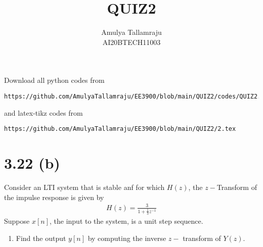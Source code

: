 \documentclass[journal,12pt,twocolumn]{IEEEtran}
\begin{document}
     \def\centbox#1{\makebox[0in]{#1}}
     \def\topbox#1{\raisebox{-\baselineskip}[0in][0in]{#1}}
     \def\midbox#1{\raisebox{-0.5\baselineskip}[0in][0in]{#1}}
\vspace{3cm}
\title{QUIZ2}
\author{Amulya Tallamraju \\ AI20BTECH11003}
\maketitle
\newpage
\bigskip
\renewcommand{\thefigure}{\theenumi}
\renewcommand{\thetable}{\theenumi}
Download all python codes from 
\begin{lstlisting}
https://github.com/AmulyaTallamraju/EE3900/blob/main/QUIZ2/codes/QUIZ2.py
\end{lstlisting}
%
and latex-tikz codes from 
%
\begin{lstlisting}
https://github.com/AmulyaTallamraju/EE3900/blob/main/QUIZ2/2.tex
\end{lstlisting}
%
\section{3.22 (b)}
Consider  an LTI system that is stable anf for which $H(z)$, the $z-$Transform of the impulse response is given by
\begin{align}
    H(z)=\frac{3}{1+\frac{1}{3}z^{-1}}
\end{align}
Suppose $x[n]$, the input to the system, is a unit step sequence.
\begin{enumerate}
    \item Find the output $y[n]$ by computing the inverse $z-$ transform of $Y(z)$.
\end{enumerate}

%
\end{document}
